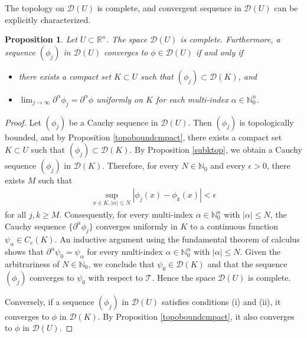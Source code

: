 \documentclass{article}
\numberwithin{equation}{section}
\newcommand{\bbN}{\mathbb{N}}
\newcommand{\bbR}{\mathbb{R}}
\newcommand{\scr}{\mathscr}
\renewcommand{\cal}{\mathcal}
\theoremstyle{plain}
\newtheorem{proposition}[theorem]{Proposition}
\theoremstyle{definition}
\begin{document}
The topology on $\cal{D}(U)$ is complete, and convergent sequence in $\cal{D}(U)$ can be explicitly characterized.
\begin{proposition}\label{convgD}
Let $U\subset\bbR^n$. The space $\cal{D}(U)$ is complete. Furthermore, a sequence $(\phi_j)$ in $\cal{D}(U)$ converges to $\phi\in\cal{D}(U)$ if and only if
\begin{itemize}
	\item[(i)] there exists a compact set $K\subset U$ such that $(\phi_j)\subset\cal{D}(K)$, and
	\item[(ii)] $\lim_{j\to\infty}\partial^\alpha\phi_j=\partial^\alpha\phi$ uniformly on $K$ for each multi-index $\alpha\in\bbN_0^n$.
\end{itemize}
\end{proposition}
\begin{proof}
Let $(\phi_j)$ be a Cauchy sequence in $\cal{D}(U)$. Then $(\phi_j)$ is topologically bounded, and by Proposition \ref{topoboundcmpact}, there exists a compact set $K\subset U$ such that $(\phi_j)\subset\cal{D}(K)$. By Proposition \ref{subktop}, we obtain a Cauchy sequence $(\phi_j)$ in $\cal{D}(K)$. Therefore, for every $N\in\bbN_0$ and every $\epsilon>0$, there exists $M$ such that
\begin{align*}
	\sup_{x\in K,\vert\alpha\vert\leq N}\left\vert\phi_j(x)-\phi_k(x)\right\vert<\epsilon
\end{align*}
for all $j,k\geq M$. Consequently, for every multi-index $\alpha\in\bbN_0^n$ with $\vert\alpha\vert\leq N$, the Cauchy sequence $\{\partial^\alpha\phi_j\}$ converges uniformly in $K$ to a continuous function $\psi_\alpha\in C_c(K)$. An inductive argument using the fundamental theorem of calculus shows that $\partial^\alpha\psi_0=\psi_\alpha$ for every multi-index $\alpha\in\bbN_0^n$ with $\vert\alpha\vert\leq N$. Given the arbitrariness of $N\in\bbN_0$, we conclude that $\psi_0\in\cal{D}(K)$ and that the sequence $(\phi_j)$ converges to $\psi_0$ with respect to $\scr{T}$. Hence the space $\cal{D}(U)$ is complete.

Conversely, if a sequence $(\phi_j)$ in $\cal{D}(U)$ satisfies conditions (i) and (ii), it converges to $\phi$ in $\cal{D}(K)$. By Proposition \ref{topoboundcmpact}, it also converges to $\phi$ in $\cal{D}(U)$.
\end{proof}
\end{document}
